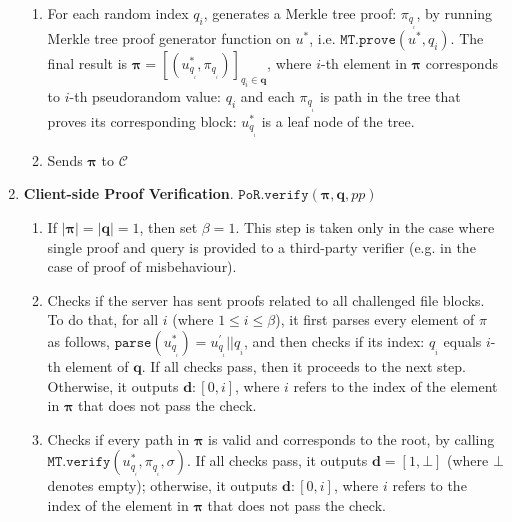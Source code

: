\begin{enumerate}
\begin{enumerate}
\item For each random index $q_{\scriptscriptstyle i}$, generates a Merkle tree proof: $\pi_{\scriptscriptstyle{q_{_{\scriptscriptstyle i}}}}$, by  running Merkle tree proof generator function on $u^{\scriptscriptstyle *}$, i.e. $\mathtt{MT.prove}(u^{*},q_{\scriptscriptstyle i})$. The final result  is $ {\bm{\pi}}=[(u^{\scriptscriptstyle *}_{\scriptscriptstyle q_{_{\scriptscriptstyle i}}},\pi_{\scriptscriptstyle q_{_{\scriptscriptstyle i}}})]_{\scriptscriptstyle q_{\scriptscriptstyle i}\in {\bm{q}}}$, where $i$-th element in $ {\bm{\pi}}$ corresponds to $i$-th pseudorandom value: $q_{\scriptscriptstyle i}$ and   each $\pi_{\scriptscriptstyle{q_{_{\scriptscriptstyle i}}}}$ is path in the tree that proves its corresponding block: $u^{\scriptscriptstyle *}_{\scriptscriptstyle q_{_{\scriptscriptstyle i}}}$ is a leaf node of the  tree. 

\item Sends $ {\bm{\pi}}$ to $\mathcal{C}$
 \end{enumerate}
\item\label{PoR-verify}\textbf{Client-side Proof Verification}. $\mathtt{PoR.verify}( {\bm{\pi}},\bm{q},pp)$ 
\begin{enumerate}

\item If $|\bm{\pi}|=|\bm{q}|=1$, then set $\beta=1$. This step is taken only in the case where single proof and query is provided to a third-party verifier (e.g. in the case of proof of misbehaviour). 
\item Checks if the server has sent proofs related to all challenged file blocks. To do that, for all $i$ (where $1\leq i\leq \beta$),  it first parses every  element of $\pi$ as follows, $\mathtt{parse}(u^{\scriptscriptstyle *}_{\scriptscriptstyle q_{_{\scriptscriptstyle i}}})=u^{\scriptscriptstyle '}_{\scriptscriptstyle q_{_{\scriptscriptstyle i}}}||q_{_{\scriptscriptstyle i}}$, and then checks if its index: $q_{_{\scriptscriptstyle i}}$ equals $i$-th element of $ {\bm{q}}$. If all checks pass, then it proceeds to the next step. Otherwise,  it outputs $ {\bm{d}}:[0,i]$, where $i$ refers to the index of the  element in $ {\bm{\pi}}$ that does not pass the check. 


\item Checks if every path in  $ {\bm{\pi}}$ is valid and corresponds to the root, by calling $\mathtt{MT.verify}(u^{\scriptscriptstyle *}_{\scriptscriptstyle q_{_{\scriptscriptstyle i}}},\pi_{\scriptscriptstyle q_{_{\scriptscriptstyle i}}},\sigma)$. If all checks pass, it outputs $ {\bm{d}}=[1,\bot]$ (where $\bot$ denotes empty); otherwise, it outputs $ {\bm{d}}:[0,i]$, where $i$ refers to the index of the  element in $ {\bm{\pi}}$ that does not pass the check. 
\end{enumerate}
\end{enumerate}



